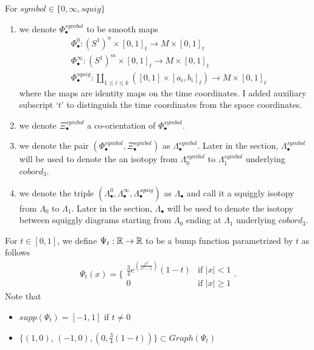 \begin{definition}
For $symbol\in\{0,\infty, squig \}$
\begin{enumerate}
\item we denote $\Phi_\bullet^{symbol}$ to be smooth maps
\begin{align*}
&\Phi_\bullet^0 : (S^1)^n \times [0,1]_t \rightarrow M \times [0,1]_t \\
&\Phi_\bullet^\infty : (S^1)^m \times [0,1]_t \rightarrow M \times [0,1]_t \\
&\Phi_\bullet^{squig} : \coprod_{1\leq i \leq k} ([0,1] \times [a_i,b_i]_t) \rightarrow M \times [0,1]_t
\end{align*}
where the maps are identity maps on the time coordinates. I added auxiliary subscript `$t$' to distinguish the time coordinates from the space coordinates.

\item we denote $\Xi_\bullet^{symbol}$ a co-orientation of $\Phi_\bullet^{symbol}$.

\item we denote the pair $(\Phi_\bullet^{symbol},\Xi_\bullet^{symbol})$ as $\Lambda_\bullet^{symbol}$. Later in the section, $\Lambda_\bullet^{symbol}$ will be used to denote the an isotopy from $\Lambda_0^{symbol}$ to $\Lambda_1^{symbol}$ underlying $cobord_3$.

\item we denote the triple $(\Lambda_\bullet^{0},\Lambda_\bullet^{\infty},\Lambda_\bullet^{squig})$ as $\Lambda_\bullet$ and call it a squiggly isotopy from $\Lambda_0$ to $\Lambda_1$. Later in the section, $\Lambda_\bullet$ will be used to denote the isotopy between squiggly diagrams starting from $\Lambda_0$ ending at $\Lambda_1$ underlying $cobord_3$.
\end{enumerate}
\end{definition}

\begin{definition}
For $t \in [0,1]$, we define $\Psi_t: \mathbb{R} \rightarrow \mathbb{R}$ to be a bump function parametrized by $t$ as follows
\[\Psi_t(x)=\bigg\{
\begin{array}{ll}
    \frac{3}{4}e^{(\frac{x^2}{x^2 - 1})}(1-t) & \text{if } |x| < 1 \\
    0 & \text{if } |x| \geq 1
\end{array}
\bigg.
\]
Note that 
\begin{itemize}
\item $supp(\Psi_t) = [-1,1]$ if $t\neq 0$

\item $\{(1,0)$, $(-1,0),(0, \frac{3}{4}(1-t))\} \subset Graph(\Psi_t)$
\end{itemize}
\end{definition}

